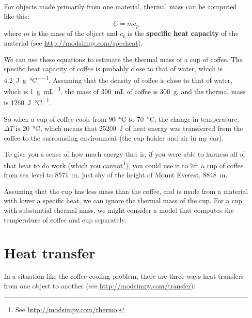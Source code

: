 \documentclass[12pt]{book}
\theoremstyle{exercise}
\begin{document}

For objects made primarily from one material, thermal mass can be computed like this:
%
\[ C = m c_p \]
%
where $m$ is the mass of the object and $c_p$ is the {\bf specific heat capacity} of the material (see \url{http://modsimpy.com/specheat}).


We can use these equations to estimate the thermal mass of a cup of coffee.  The specific heat capacity of coffee is probably close to that of water, which is \SI{4.2}{\joule\per\gram\per\celsius}.  Assuming that the density of coffee is close to that of water, which is \SI{1}{\gram\per\milli\liter}, the mass of \SI{300}{\milli\liter} of coffee is \SI{300}{\gram}, and the thermal mass is \SI{1260}{\joule\per\celsius}.


So when a cup of coffee cools from \SI{90}{\celsius} to \SI{70}{\celsius}, the change in temperature, $\Delta T$ is \SI{20}{\celsius}, which means that \SI{25200}{\joule} of heat energy was transferred from the coffee to the surrounding environment (the cup holder and air in my car).

To give you a sense of how much energy that is, if you were able to harness all of that heat to do work (which you cannot\footnote{See \url{http://modsimpy.com/thermo}.}), you could use it to lift a cup of coffee from sea level to \SI{8571}{\meter}, just shy of the height of Mount Everest, \SI{8848}{\meter}.


Assuming that the cup has less mass than the coffee, and is made from a material with lower a specific heat, we can ignore the thermal mass of the cup.
For a cup with substantial thermal mass, we might consider a model that computes the temperature of coffee and cup separately.


\section{Heat transfer}

In a situation like the coffee cooling problem, there are three ways heat transfers from one object to another (see \url{http://modsimpy.com/transfer}):

\end{document}
